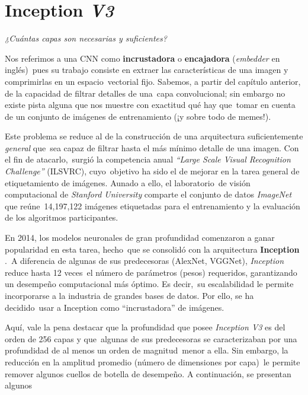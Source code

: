 \section{Inception \emph{V3}}
\label{inception-section}

\begin{center}
  \emph{¿Cuántas capas son necesarias y suficientes?}
\end{center}\par
\noindent
Nos referimos a una CNN como \textbf{incrustadora} o \textbf{encajadora} (\emph{embedder} en inglés)\
pues su trabajo consiste en extraer las características de una imagen y comprimirlas en un espacio\
vectorial fijo. Sabemos, a partir del capítulo anterior, de la capacidad de filtrar detalles de una\
capa convolucional; sin embargo no existe pista alguna que nos muestre con exactitud qué hay que\
tomar en cuenta de un conjunto de imágenes de entrenamiento (¡y sobre todo de memes!).\par
Este problema se reduce al de la construcción de una arquitectura suficientemente \emph{general} que\
sea capaz de filtrar hasta el más mínimo detalle de una imagen. Con el fin de atacarlo,\
surgió la competencia anual \emph{``Large Scale Visual Recognition Challenge''} (ILSVRC), cuyo\
objetivo ha sido el de mejorar en la tarea general de etiquetamiento de imágenes. Aunado a ello, el laboratorio\
de visión computacional de \emph{Stanford University} comparte el conjunto de datos \emph{ImageNet} que reúne\
14,197,122 imágenes etiquetadas para el entrenamiento y la evaluación de los algoritmos participantes.\par
En 2014, los modelos neuronales de gran profundidad comenzaron a ganar popularidad en esta tarea, hecho\
que se consolidó con la arquitectura \textbf{Inception} \cite{DBLP:journals/corr/SzegedyVISW15}.\
A diferencia de algunas de sus predecesoras (AlexNet, VGGNet), \emph{Inception} reduce hasta 12 veces\
el número de parámetros (pesos) requeridos, garantizando un desempeño computacional más óptimo. Es decir,\
su escalabilidad le permite incorporarse a la industria de grandes bases de datos. Por ello, se ha decidido\
usar a Inception como ``incrustadora'' de imágenes.\par
Aquí, vale la pena destacar que la profundidad que posee \emph{Inception V3} es del orden de 256 capas y que\
algunas de sus predecesoras se caracterizaban por una profundidad de al menos un orden de magnitud\
menor a ella. Sin embargo, la reducción en la amplitud promedio (número de dimensiones por capa)\
le permite remover algunos cuellos de botella de desempeño. A continuación, se presentan algunos\
